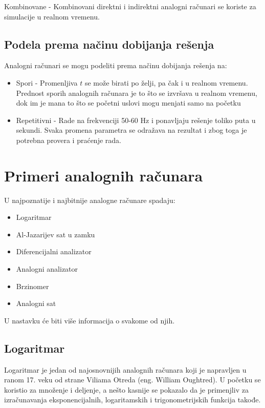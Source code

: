 \documentclass[a4paper]{article}
\begin{document}
Kombinovane - Kombinovani direktni i indirektni analogni računari se koriste za simulacije u realnom vremenu.

\subsection{Podela prema načinu dobijanja rešenja}

Analogni računari se mogu podeliti prema načinu dobijanja rešenja na:

	\begin{itemize}
		\item Spori - Promenljiva $t$ se može birati po želji, pa čak i u realnom vremenu. Prednost sporih analognih računara je to što se izvršava u realnom vremenu, dok im je mana to što se početni uslovi mogu menjati samo na početku 
		\item Repetitivni - Rade na frekvenciji 50-60 Hz i ponavljaju rešenje toliko puta u sekundi. Svaka promena parametra se odražava na rezultat i zbog toga je potrebna provera i praćenje rada.
	\end{itemize}

\section{Primeri analognih računara}
\label{sec:naslov1}

U najpoznatije i najbitnije analogne računare spadaju:
	\begin{itemize}
		\item Logaritmar
		\item Al-Jazarijev sat u zamku
 		\item Diferencijalni analizator
		\item Analogni analizator
		\item Brzinomer
		\item Analogni sat
	\end{itemize}
 U nastavku će biti više informacija o svakome od njih.

\subsection{Logaritmar}
\label{subsec:podnaslov1}

Logaritmar je jedan od najosnovnijih analognih računara koji je napravljen u ranom 17. veku od strane Viliama Otreda (eng. William Oughtred). U početku se koristio za množenje i deljenje, a nešto kasnije se pokazalo da je primenjliv za izračunavanja eksponencijalnih, logaritamskih i trigonometrijskih funkcija takođe.
\end{document}

